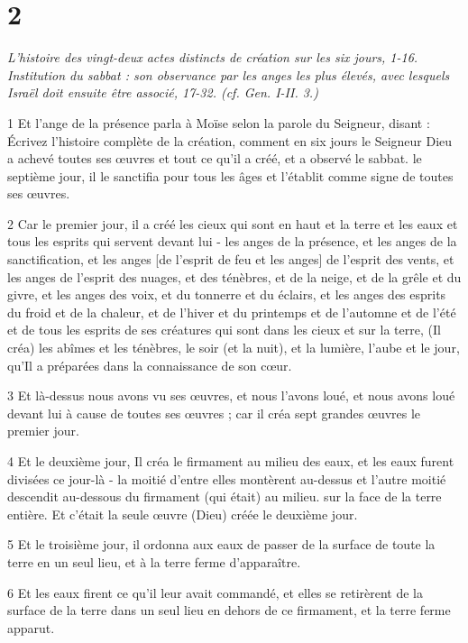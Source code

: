 \chapter{2}

\par \textit{L'histoire des vingt-deux actes distincts de création sur les six jours, 1-16. Institution du sabbat : son observance par les anges les plus élevés, avec lesquels Israël doit ensuite être associé, 17-32. (cf. Gen. I-II. 3.)}

\par 1 Et l'ange de la présence parla à Moïse selon la parole du Seigneur, disant : Écrivez l'histoire complète de la création, comment en six jours le Seigneur Dieu a achevé toutes ses œuvres et tout ce qu'il a créé, et a observé le sabbat. le septième jour, il le sanctifia pour tous les âges et l'établit comme signe de toutes ses œuvres.
\par 2 Car le premier jour, il a créé les cieux qui sont en haut et la terre et les eaux et tous les esprits qui servent devant lui - les anges de la présence, et les anges de la sanctification, et les anges [de l'esprit de feu et les anges] de l'esprit des vents, et les anges de l'esprit des nuages, et des ténèbres, et de la neige, et de la grêle et du givre, et les anges des voix, et du tonnerre et du éclairs, et les anges des esprits du froid et de la chaleur, et de l'hiver et du printemps et de l'automne et de l'été et de tous les esprits de ses créatures qui sont dans les cieux et sur la terre, (Il créa) les abîmes et les ténèbres, le soir (et la nuit), et la lumière, l'aube et le jour, qu'Il a préparées dans la connaissance de son cœur.
\par 3 Et là-dessus nous avons vu ses œuvres, et nous l'avons loué, et nous avons loué devant lui à cause de toutes ses œuvres ; car il créa sept grandes œuvres le premier jour.
\par 4 Et le deuxième jour, Il créa le firmament au milieu des eaux, et les eaux furent divisées ce jour-là - la moitié d'entre elles montèrent au-dessus et l'autre moitié descendit au-dessous du firmament (qui était) au milieu. sur la face de la terre entière. Et c'était la seule œuvre (Dieu) créée le deuxième jour.
\par 5 Et le troisième jour, il ordonna aux eaux de passer de la surface de toute la terre en un seul lieu, et à la terre ferme d'apparaître.
\par 6 Et les eaux firent ce qu'il leur avait commandé, et elles se retirèrent de la surface de la terre dans un seul lieu en dehors de ce firmament, et la terre ferme apparut.
